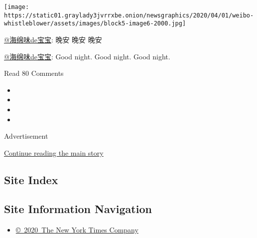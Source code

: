 \texttt{[image: https://static01.graylady3jvrrxbe.onion/newsgraphics/2020/04/01/weibo-whistleblower/assets/images/block5-image6-2000.jpg]}

\href{https://www.weibo.com/u/6933003313?is_hot=1}{@海绵味de宝宝}: 晚安
晚安 晚安

\href{https://www.weibo.com/u/6933003313?is_hot=1}{@海绵味de宝宝}: Good
night. Good night. Good night.

Read 80 Comments

\begin{itemize}
\item
\item
\item
\item
\end{itemize}

Advertisement

\protect\hyperlink{after-bottom}{Continue reading the main story}

\hypertarget{site-index}{%
\subsection{Site Index}\label{site-index}}

\hypertarget{site-information-navigation}{%
\subsection{Site Information
Navigation}\label{site-information-navigation}}

\begin{itemize}
\tightlist
\item
  \href{https://help.nytimes3xbfgragh.onion/hc/en-us/articles/115014792127-Copyright-notice}{©~2020~The
  New York Times Company}
\end{itemize}

